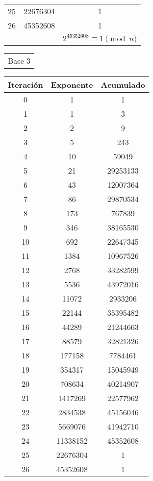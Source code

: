 \documentclass[fleqn]{article}
\begin{document}
\begin{center}
\begin{tabular}{c | c | c}
            25 & 22676304 & 1 \\
            26 & 45352608 & 1 \\ \hline
            && $ 2^{45352608} \equiv  1 \pmod{n}$
        \end{tabular}
        \newpage
        \begin{tabular}{c}
            Base 3 \\
        \end{tabular}
        \begin{tabular}{c | c | c}
            Iteración & Exponente & Acumulado \\ \hline
            0 & 1 & 1 \\
            1 & 1 & 3 \\
            2 & 2 & 9 \\
            3 & 5 & 243 \\
            4 & 10 & 59049 \\
            5 & 21 & 29253133 \\
            6 & 43 & 12007364 \\
            7 & 86 & 29870534 \\
            8 & 173 & 767839 \\
            9 & 346 & 38165530 \\
            10 & 692 & 22647345 \\
            11 & 1384 & 10967526 \\
            12 & 2768 & 33282599 \\
            13 & 5536 & 43972016 \\
            14 & 11072 & 2933206 \\
            15 & 22144 & 35395482 \\
            16 & 44289 & 21244663 \\
            17 & 88579 & 32821326 \\
            18 & 177158 & 7784461 \\
            19 & 354317 & 15045949 \\
            20 & 708634 & 40214907 \\
            21 & 1417269 & 22577962 \\
            22 & 2834538 & 45156046 \\
            23 & 5669076 & 41942710 \\
            24 & 11338152 & 45352608 \\
            25 & 22676304 & 1 \\
            26 & 45352608 & 1 \\ \hline

\end{tabular}
\end{center}
\end{document}
